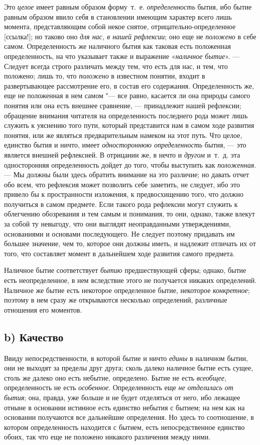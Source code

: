 Это {\em целое} имеет равным образом форму~т.~е.
{\em определенность} бытия, ибо бытие равным образом
явило себя в становлении имеющим характер всего лишь момента,
представляющим собой некое снятое,
отрицательно-определенное
[ссылка!]; но таково оно
{\em для нас, в нашей рефлексии}; оно еще не
{\em положено} в себе самом. Определенность же
наличного бытия как таковая есть положенная определенность, на что
указывает также и выражение «{\em наличное бытие}». —
Следует всегда строго различать между тем, что есть для нас, и тем, что
положено; лишь то, что {\em положено} в известном
понятии, входит в развертывающее рассмотрение его, в состав его содержания.
Определенность же, еще не положенная в нем самом "--- все равно, касается ли
она природы самого понятия или она есть внешнее сравнение, — принадлежит
нашей рефлексии; обращение внимания читателя на определенность последнего
рода может лишь служить к уяснению того пути, который представится нам в
самом ходе развития понятия, или же являться предварительным намеком на
этот путь. Что целое, единство бытия и ничто, имеет
{\em одностороннюю определенность} бытия, — это
является внешней рефлексией. В отрицании же, в нечто и
{\em другом} и~т.~д. эта односторонняя определенность
дойдет до того, чтобы выступить как {\em положенная}. —
Мы должны были здесь обратить внимание на это различие; но давать отчет обо
всем, что рефлексия может позволить себе заметить, не следует, ибо это
привело бы к пространности изложения, к предвосхищению того, что должно
получиться в самом предмете. Если такого рода рефлексии могут служить к
облегчению обозревания и тем самым и понимания, то они, однако, также
влекут за собой ту невыгоду, что они выглядят неоправданными утверждениями,
основаниями и основами последующего. Не следует поэтому придавать им
большее значение, чем то, которое они должны иметь, и надлежит отличать их
от того, что составляет момент в дальнейшем ходе развития самого предмета.

Наличное бытие соответствует {\em бытию} предшествующей
сферы; однако, бытие есть неопределенное, в нем вследствие этого не
получается никаких определений. Наличное же бытие есть некоторое
определенное бытие, некоторое {\em конкретное}; поэтому
в нем сразу же открываются несколько определений, различные отношения его
моментов.

\subsection*{b) Качество}
Ввиду непосредственности, в которой бытие и ничто
{\em едины} в наличном бытии, они не выходят за пределы
друг друга; сколь далеко наличное бытие есть сущее, столь же далеко оно
есть небытие, определено. Бытие не есть {\em всеобщее},
определенность не есть {\em особенное}. Определенность
еще {\em не отделилась от бытия}; она, правда, уже
больше и не будет отделяться от него, ибо лежащее отныне в основании
истинное есть единство небытия с бытием; на нем как на основании получаются
все дальнейшие определения. Но здесь то соотношение, в котором
определенность находится с бытием, есть непосредственное единство обоих,
так что еще не положено никакого различения между ними.

